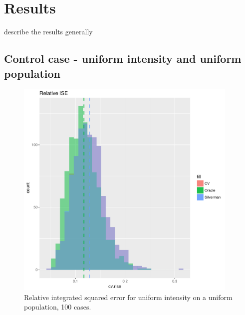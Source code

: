 
\section{Results}

describe the results generally

\subsection{Control case - uniform intensity and uniform population}



\begin{figure}[tb]
    \centering
    \includegraphics[width=0.95\textwidth]{results/unif_100_1_unif/output/ise-relative-histogram}
    \caption[Relative ISE: uniform on uniform]{Relative integrated squared error for uniform intensity on a uniform population, 100 cases.}
    \label{fig:rise_unif_100_1_unif}
\end{figure}